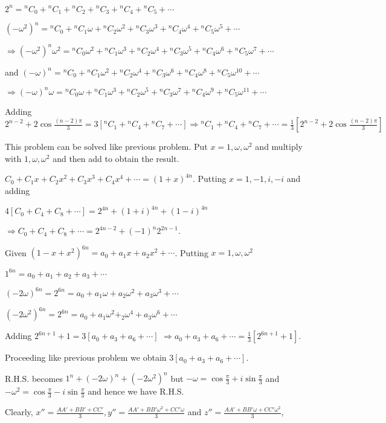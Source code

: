   $2^n = {}^nC_0 + {}^nC_1 + {}^nC_2 + {}^nC_3 + {}^nC_4 + {}^nC_5 + \cdots$

  $(-\omega^2)^n = {}^nC_0 + {}^nC_1\omega + {}^nC_2\omega^2 + {}^nC_3\omega^3 + {}^nC_4\omega^4 +
  {}^nC_5\omega^5 + \cdots$

  $\Rightarrow (-\omega^2)^{n}\omega^2 = {}^nC_0\omega^2 + {}^nC_1\omega^3 + {}^nC_2\omega^4 + {}^nC_3\omega^5 + {}^nC_4\omega^6 +
  {}^nC_5\omega^7 + \cdots$

  and $(-\omega)^n = {}^nC_0 + {}^nC_1\omega^2 + {}^nC_2\omega^4 + {}^nC_3\omega^6 + {}^nC_4\omega^8 +
  {}^nC_5\omega^{10} + \cdots$

  $\Rightarrow (-\omega)^n\omega = {}^nC_0\omega + {}^nC_1\omega^3 + {}^nC_2\omega^5 + {}^nC_3\omega^7 + {}^nC_4\omega^9 +
  {}^nC_5\omega^{11} + \cdots$

  Adding $2^{n - 2} + 2\cos\frac{(n- 2)\pi}{3} = 3[{}^nC_1 + {}^nC_4 + {}^nC_7 + \cdots] \Rightarrow {}^nC_1
  + {}^nC_4 + {}^nC_7 + \cdots = \frac{1}{3}\left[2^{n - 2} + 2\cos\frac{(n - 2)\pi}{3}\right]$
\item This problem can be solved like previous problem. Put $x = 1, \omega, \omega^2$ and multiply with $1,
  \omega, \omega^2$ and then add to obtain the result.
\item $C_0 + C_1x + C_2x^2 + C_3x^3 + C_4x^4 + \cdots = (1 + x)^{4n}$. Putting $x = 1, -1, i, -i$ and adding

  $4[C_0 + C_4 + C_8 + \cdots] = 2^{4n} + (1 + i)^{4n} + (1 - i)^{4n}$

  $\Rightarrow C_0 + C_4 + C_8 + \cdots = 2^{4n - 2} + (-1)^n2^{2n - 1}$.
\item Given $(1 - x + x^2)^{6n} = a_0 + a_1x + a_2x^2 + \cdots$. Putting $x = 1, \omega, \omega^2$

  $1^{6n} = a_0 + a_1 + a_2 + a_3 + \cdots$

  $(-2\omega)^{6n}= 2^{6n} = a_0 + a_1\omega + a_2\omega^2 + a_3\omega^3 + \cdots$

  $(-2\omega^2)^{6n}= 2^{6n} = a_0 + a_1\omega^2 + _2\omega^4 + a_3\omega^6 + \cdots$

  Adding $2^{6n + 1} + 1 = 3[a_0 + a_3 + a_6 + \cdots]$
  $\Rightarrow a_0 + a_3 + a_6 + \cdots = \frac{1}{3}[2^{6n + 1} + 1]$.
\item Proceeding like previous problem we obtain $3[a_0 + a_3 + a_6 + \cdots]$.

  R.H.S. becomes $1^n + (-2\omega)^n + (-2\omega^2)^n$ but $-\omega = \cos\frac{\pi}{3} +
  i\sin\frac{\pi}{3}$ and $-\omega^2 = \cos\frac{\pi}{3} - i\sin\frac{\pi}{3}$ and hence we have R.H.S.
\item Clearly, $x'' = \frac{AA' + BB' + CC'}{3}, y'' = \frac{AA' + BB'\omega^2 + CC'\omega}{3}$ and $z'' =
  \frac{AA' + BB'\omega + CC'\omega^2}{3}$,

